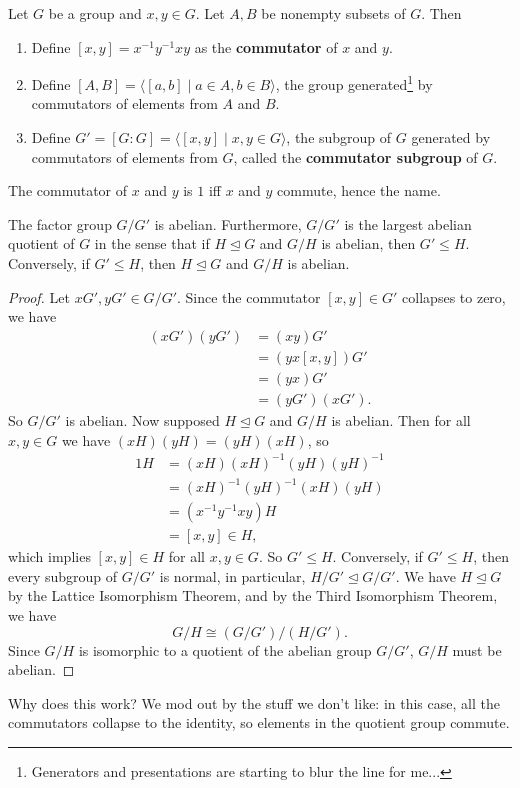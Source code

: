 \begin{definition}[Commutators]
    Let $G$ be a group and $x,y\in G$. Let $A,B$ be nonempty subsets of $G$. Then 
    \begin{enumerate}
        \item Define $[x,y]=x^{-1}y^{-1}xy$ as the \textbf{commutator} of $x$ and $y$.
        \item Define $[A,B]=\langle [a,b] \mid a\in A,b\in B \rangle $, the group generated\footnote{Generators and presentations are starting to blur the line for me...} by commutators of elements from $A$ and $B$.
        \item Define $G'=[G:G]=\langle [x,y] \mid x,y\in G \rangle $, the subgroup of $G$ generated by commutators of elements from $G$, called the \textbf{commutator subgroup} of $G$.
    \end{enumerate}
\end{definition}
The commutator of $x$ and $y$ is $1$ iff $x$ and $y$ commute, hence the name.
\begin{prop}
    The factor group $G /G'$ is abelian. Furthermore, $G /G'$ is the largest abelian quotient of $G$ in the sense that if $H \trianglelefteq G$ and $G /H$ is abelian, then $G'\leq H$. Conversely, if $G' \leq H$, then $H \trianglelefteq G$ and $G /H$ is abelian.
\end{prop}
\begin{proof}
    Let $xG',yG'\in G /G'$. Since the commutator $[x,y]\in G'$ collapses to zero, we have 
    \begin{align*}
        (xG')(yG')&=(xy)G'\\
                  &=(yx[x,y])G'\\
                  &=(yx)G'\\
                  &=(yG')(xG').
    \end{align*}
    So $G /G'$ is abelian. Now supposed $H \trianglelefteq G$ and $G /H$ is abelian. Then for all $x,y\in G$ we have $(xH)(yH)=(yH)(xH)$, so
    \begin{align*}
        1H &= (xH)(xH)^{-1}(yH)(yH)^{-1}\\
           &=(xH)^{-1}(yH)^{-1}(xH)(yH)\\
           &=(x^{-1}y^{-1}xy)H\\
           &=[x,y]\in H,
    \end{align*}
    which implies $[x,y]\in H$ for all $x,y\in G$. So $G'\leq H$. Conversely, if  $G' \leq H$, then every subgroup of $G /G'$ is normal, in particular, $H /G' \trianglelefteq G /G'$. We have $H \trianglelefteq G$ by the Lattice Isomorphism Theorem, and by the Third Isomorphism Theorem, we have \[
        G/H\cong (G /G') / (H / G').
    \] Since $G /H$ is isomorphic to a quotient of the abelian group $G /G'$, $G /H$ must be abelian.
\end{proof}
Why does this work? We mod out by the stuff we don't like: in this case, all the commutators collapse to the identity, so elements in the quotient group commute.

